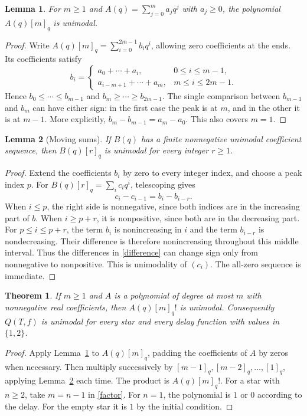 \documentclass[11pt]{article}
\newtheorem{theorem}{Theorem}
\newtheorem{lemma}{Lemma}
\begin{document}
\begin{lemma}\label{long}
For $m\geq1$ and $A(q)=\sum_{j=0}^m a_jq^j$ with $a_j\geq0$,
the polynomial $A(q)[m]_q$ is unimodal.
\end{lemma}
\begin{proof}
Write $A(q)[m]_q=\sum_{i=0}^{2m-1}b_iq^i$, allowing zero
coefficients at the ends. Its coefficients satisfy
\[
 b_i=\begin{cases}
       a_0+\cdots+a_i,&0\leq i\leq m-1,\\
       a_{i-m+1}+\cdots+a_m,&m\leq i\leq2m-1.
      \end{cases}
\]
Hence $b_0\leq\cdots\leq b_{m-1}$ and
$b_m\geq\cdots\geq b_{2m-1}$. The single comparison between
$b_{m-1}$ and $b_m$ can have either sign: in the first case
the peak is at $m$, and in the other it is at $m-1$.
More explicitly, $b_m-b_{m-1}=a_m-a_0$.
This also covers $m=1$.
\end{proof}

\begin{lemma}[Moving sums]\label{moving}
If $B(q)$ has a finite nonnegative unimodal coefficient sequence,
then $B(q)[r]_q$ is unimodal for every integer $r\geq1$.
\end{lemma}
\begin{proof}
Extend the coefficients $b_i$ by zero to every integer index,
and choose a peak index $p$. For
$B(q)[r]_q=\sum_i c_iq^i$, telescoping gives
\begin{equation}\label{difference}
 c_i-c_{i-1}=b_i-b_{i-r}.
\end{equation}
When $i\leq p$, the right side is nonnegative, since both
indices are in the increasing part of $b$. When $i\geq p+r$,
it is nonpositive, since both are in the decreasing part.
For $p\leq i\leq p+r$, the term $b_i$ is nonincreasing in $i$
and the term $b_{i-r}$ is nondecreasing. Their difference is
therefore nonincreasing throughout this middle interval.
Thus the differences in \eqref{difference} can change sign
only from nonnegative to nonpositive. This is unimodality of
$(c_i)$. The all-zero sequence is immediate.
\end{proof}

\begin{theorem}\label{main}
If $m\geq1$ and $A$ is a polynomial of degree at most $m$ with
nonnegative real coefficients, then $A(q)[m]_q!$ is unimodal.
Consequently $Q(T,f)$ is unimodal for every star and every
delay function with values in $\{1,2\}$.
\end{theorem}
\begin{proof}
Apply Lemma~\ref{long} to $A(q)[m]_q$, padding the coefficients
of $A$ by zeros when necessary. Then multiply successively by
$[m-1]_q,[m-2]_q,\ldots,[1]_q$, applying Lemma~\ref{moving}
each time. The product is $A(q)[m]_q!$.
For a star with $n\geq2$, take $m=n-1$ in \eqref{factor}.
For $n=1$, the polynomial is $1$ or $0$ according to the delay.
For the empty star it is $1$ by the initial condition.
\end{proof}
\end{document}
